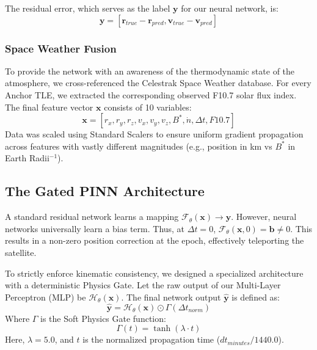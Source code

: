 The residual error, which serves as the label $\mathbf{y}$ for our neural network, is:
\begin{equation}
    \mathbf{y} =[\mathbf{r}_{true} - \mathbf{r}_{pred}, \textbf{v}_{true} - \textbf{v}_{pred}]
\end{equation}

\subsubsection{Space Weather Fusion}
To provide the network with an awareness of the thermodynamic state of the atmosphere, we cross-referenced the Celestrak Space Weather database. For every Anchor TLE, we extracted the corresponding observed F10.7 solar flux index.
The final feature vector $\mathbf{x}$ consists of 10 variables:
\begin{equation}
    \mathbf{x} =[r_x, r_y, r_z, v_x, v_y, v_z, B^*, \dot{n}, \Delta t, F10.7]
\end{equation}
Data was scaled using Standard Scalers to ensure uniform gradient propagation across features with vastly different magnitudes (e.g., position in km vs $B^*$ in Earth Radii$^{-1}$).

\subsection{The Gated PINN Architecture}
A standard residual network learns a mapping $\mathcal{F}_\theta(\mathbf{x}) \rightarrow \mathbf{y}$. However, neural networks universally learn a bias term. Thus, at $\Delta t = 0$, $\mathcal{F}_\theta(\mathbf{x}, 0) = \mathbf{b} \neq 0$. This results in a non-zero position correction at the epoch, effectively teleporting the satellite.

To strictly enforce kinematic consistency, we designed a specialized architecture with a deterministic Physics Gate.
Let the raw output of our Multi-Layer Perceptron (MLP) be $\mathcal{H}_\theta(\mathbf{x})$. The final network output $\hat{\mathbf{y}}$ is defined as:
\begin{equation}
    \hat{\mathbf{y}} = \mathcal{H}_\theta(\mathbf{x}) \odot \Gamma(\Delta t_{norm})
\end{equation}
Where $\Gamma$ is the Soft Physics Gate function:
\begin{equation}
    \Gamma(t) = \tanh(\lambda \cdot t)
\end{equation}
Here, $\lambda = 5.0$, and $t$ is the normalized propagation time ($dt_{minutes} / 1440.0$).

